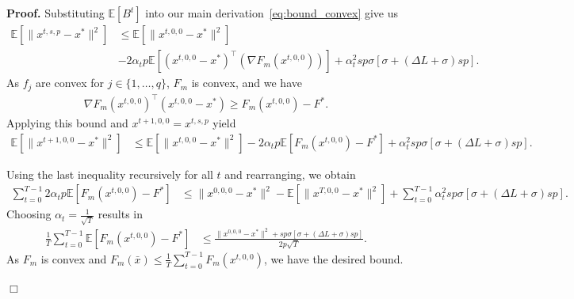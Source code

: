 \documentclass[11pt,a4paper]{article}
\numberwithin{equation}{section}%
\newenvironment{proof}[1][Proof]{\noindent \textbf{#1.} }{\hfill$\Box$\par\medskip}
\renewcommand{\(}{\left (}
\renewcommand{\)}{\right )}
\newcommand{\diam}{\Delta}
\newcommand{\Lphif}{L}
\newcommand{\Fm}{F_m}
\begin{document}
\begin{proof}
Substituting $\mathbb{E}[B^t]$ into our main derivation~\eqref{eq:bound_convex} give us
\begin{align*}
\mathbb{E}[\|x^{t,s,p} - x^*\|^2]
    &\leq \mathbb{E}[\|x^{t,0,0}- x^*\|^2]\\
    &- 2\alpha_t p\mathbb{E}[(x^{t,0,0}- x^*)^\top(\nabla \Fm(x^{t,0,0}) )] + \alpha^2_t sp \sigma[\sigma+  (\diam \Lphif +  \sigma) sp].
\end{align*}
As $f_j$ are convex for $j \in \{ 1, \dots, q\}$, $\Fm$ is convex, and we have 
\begin{align*}
\nabla  \Fm (x^{t,0,0}) ^\top \left(x^{t,0,0} - x^*\right)  \geq \Fm(x^{t,0,0}) - F^*. 
\end{align*}
Applying this bound and $x^{t+1,0,0} = x^{t,s,p}$ yield 
\begin{align*}
\mathbb{E}[\|x^{t+1,0,0} - x^*\|^2]
    &\leq \mathbb{E}[\|x^{t,0,0}- x^*\|^2] - 2\alpha_t p\mathbb{E}[\Fm(x^{t,0,0}) - F^*] + \alpha^2_t sp \sigma[\sigma+  (\diam \Lphif +  \sigma) sp].
\end{align*}

Using the last inequality recursively for all $t$ and rearranging, we obtain 
\begin{align*}
\sum_{t=0}^{T-1} 2\alpha_t p\mathbb{E}[\Fm(x^{t,0,0}) - F^*] 
    &\leq \|x^{0,0,0}- x^*\|^2 - \mathbb{E}[\|x^{T,0,0} - x^*\|^2] +\sum_{t=0}^{T-1} \alpha^2_t sp \sigma[\sigma+  (\diam \Lphif +  \sigma) sp]. 
\end{align*}
Choosing $\alpha_t = \frac{1}{\sqrt{T}}$ results in
\begin{align*}
\frac{1}{T} \sum_{t=0}^{T-1}  \mathbb{E}[\Fm(x^{t,0,0}) - F^*] 
    &\leq \frac{\|x^{0,0,0}- x^*\|^2 + sp \sigma[\sigma+  (\diam \Lphif +  \sigma) sp]}{2p\sqrt{T}} . 
\end{align*}
As $\Fm$ is convex and 
$\Fm(\bar{x})\leq  \frac{1}{T}\sum_{t=0}^{T-1}\Fm (x^{t,0,0})$, we have the desired bound. 





\end{proof}
\end{document}
